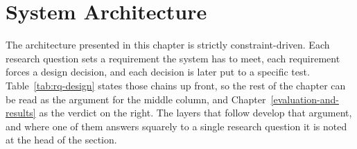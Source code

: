 \chapter{System Architecture}\label{system-architecture}

The architecture presented in this chapter is strictly constraint-driven. Each research question sets a requirement the system has to meet, each requirement forces a design decision, and each decision is later put to a specific test. Table~\ref{tab:rq-design} states those chains up front, so the rest of the chapter can be read as the argument for the middle column, and Chapter~\ref{evaluation-and-results} as the verdict on the right. The layers that follow develop that argument, and where one of them answers squarely to a single research question it is noted at the head of the section.

\renewcommand{\arraystretch}{1.5} 

